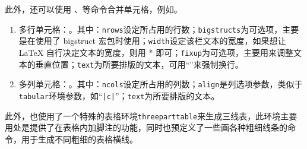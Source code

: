 此外，还可以使用 、等命令合并单元格，例如。
\begin{enumerate}
	\item 多行单元格：。其中：\texttt{nrows}设定所占用的行数；\texttt{bigstructs}为可选项，主要是在使用了 bigstruct 宏包时使用；\texttt{width}设定该栏文本的宽度，如果想让 LaTeX 自行决定文本的宽度，则用 * 即可；\texttt{fixup}为可选项，主要用来调整文本的垂直位置；\texttt{text}为所要排版的文本，可用“\ltxcmdname{\textbackslash}”来强制换行。
    \item 多列单元格：。其中：\texttt{ncols}设定所占用的列数；\texttt{align}是列选项参数，类似于\texttt{tabular}环境参数，如“\texttt{|c|}”；\texttt{text}为所要排版的文本。
\end{enumerate}

此外，也使用了一个特殊的表格环境\texttt{threeparttable}来生成三线表，此环境主要用处是提供了在表格内加脚注的功能，同时也预定义了一些画各种粗细线条的命令，用于生成不同粗细的表格横线。

